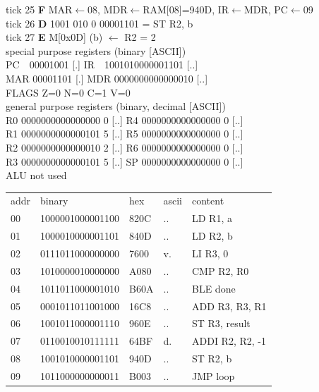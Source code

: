 \noindent\begin{tcolorbox}[stepbox, title={Instruction 9 \hfill ticks 25 to 27 \quad ST R2, b}]
\textcolor{dim}{tick 25} \textbf{F} MAR$\leftarrow$08, MDR$\leftarrow$RAM[08]=940D, IR$\leftarrow$MDR, PC$\leftarrow$09\\
\textcolor{dim}{tick 26} \textbf{D} 1001 010 0 00001101 = ST R2, b\\
\textcolor{dim}{tick 27} \textbf{E} M[0x0D] (b) $\leftarrow$ R2 = 2\\[2pt]
\textcolor{dim}{special purpose registers (binary [ASCII])}\\
PC~~00001001 [.] \hfill IR~~1001010000001101 [..]\\
MAR 00001101 [.] \hfill MDR 0000000000000010 [..]\\
FLAGS Z=0 N=0 C=1 V=0\\[2pt]
\textcolor{dim}{general purpose registers (binary, decimal [ASCII])}\\
R0 0000000000000000 0 [..] \hfill R4 0000000000000000 0 [..]\\
R1 0000000000000101 5 [..] \hfill R5 0000000000000000 0 [..]\\
R2 0000000000000010 2 [..] \hfill R6 0000000000000000 0 [..]\\
R3 0000000000000101 5 [..] \hfill SP 0000000000000000 0 [..]\\
\textcolor{dim}{ALU not used}\\[2pt]
{\setlength{\tabcolsep}{2pt}\begin{tabular}{@{}lllll@{}}
\textcolor{dim}{addr} & \textcolor{dim}{binary} & \textcolor{dim}{hex} & \textcolor{dim}{ascii} & \textcolor{dim}{content}\\
00 & 1000001000001100 & 820C & .. & LD R1, a\\
01 & 1000010000001101 & 840D & .. & LD R2, b\\
02 & 0111011000000000 & 7600 & v. & LI R3, 0\\
03 & 1010000010000000 & A080 & .. & CMP R2, R0\\
04 & 1011011000001010 & B60A & .. & BLE done\\
05 & 0001011011001000 & 16C8 & .. & ADD R3, R3, R1\\
06 & 1001011000001110 & 960E & .. & ST R3, result\\
07 & 0110010010111111 & 64BF & d. & ADDI R2, R2, -1\\
08 & 1001010000001101 & 940D & .. & ST R2, b\\
\rowcolor{pcc}09 & 1011000000000011 & B003 & .. & JMP loop\\

\end{tabular}}
\end{tcolorbox}
